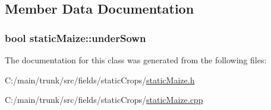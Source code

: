 \subsection{Member Data Documentation}
\hypertarget{classstatic_maize_a741540de20c7cd002125e391bbd272ef}{
\subsubsection[{underSown}]{\setlength{\rightskip}{0pt plus 5cm}bool {\bf staticMaize::underSown}}}
\label{classstatic_maize_a741540de20c7cd002125e391bbd272ef}


The documentation for this class was generated from the following files:\begin{DoxyCompactItemize}
\item 
C:/main/trunk/src/fields/staticCrops/\hyperlink{static_maize_8h}{staticMaize.h}\item 
C:/main/trunk/src/fields/staticCrops/\hyperlink{static_maize_8cpp}{staticMaize.cpp}\end{DoxyCompactItemize}
